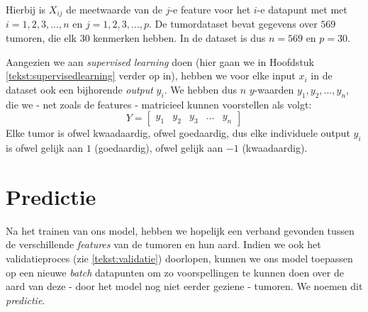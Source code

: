 \documentclass[TeamE-eindrapport]{subfiles}
\begin{document}
	Hierbij is \(X_{ij}\) de meetwaarde van de \(j\)-e feature voor het \(i\)-e datapunt met met \(i=1,2,3,...,n\) en \(j=1,2,3,...,p\). De tumordataset bevat gegevens over \(569\) tumoren, die elk \(30\) kenmerken hebben. In de dataset is dus \(n=569\) en \(p=30\).
	
	Aangezien we aan \textit{supervised learning} doen (hier gaan we in Hoofdstuk \ref{tekst:supervisedlearning} verder op in), hebben we voor elke input \(x_i\) in de dataset ook een bijhorende \textit{output} \(y_i\). We hebben dus \(n\) \(y\)-waarden \(y_1,y_2,...,y_n\), die we - net zoals de features - matricieel kunnen voorstellen als volgt: \[Y =  \left[ \begin{array}{ccccc} y_1 & y_2 & y_3 & \ldots & y_n \end{array} \right]\] Elke tumor is ofwel kwaadaardig, ofwel goedaardig, dus elke individuele output \(y_i\) is ofwel gelijk aan \(1\) (goedaardig), ofwel gelijk aan \(-1\) (kwaadaardig).
	
	\section{Predictie}
	
	Na het trainen van ons model, hebben we hopelijk een verband gevonden tussen de verschillende \textit{features} van de tumoren en hun aard. Indien we ook het validatieproces (zie \ref{tekst:validatie}) doorlopen, kunnen we ons model toepassen op een nieuwe \textit{batch} datapunten om zo voorspellingen te kunnen doen over de aard van deze - door het model nog niet eerder geziene - tumoren. We noemen dit \textit{predictie}.
		
	\nocite{KML}
	
\end{document}
